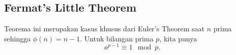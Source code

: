 \subsection{Fermat's Little Theorem}
Teorema ini merupakan kasus khusus dari Euler's Theorem saat $n$ prima sehingga $\phi(n)=n-1$. Untuk bilangan prima $p$, kita punya
$$a^{p-1} \equiv 1 \mod p.$$